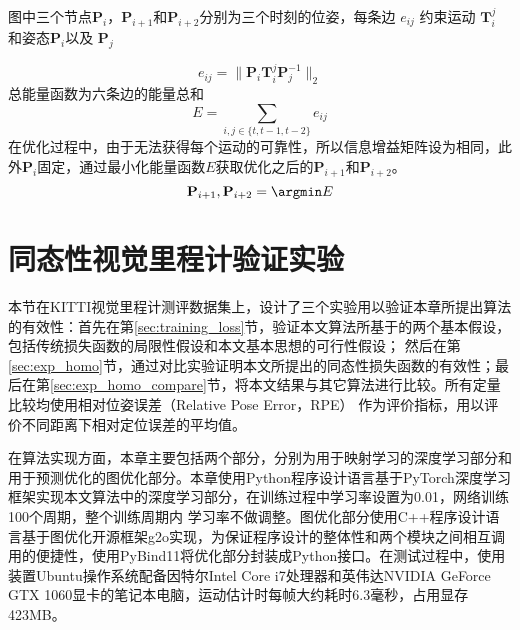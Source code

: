图中三个节点$\mathbf{P}_i$，$\mathbf{P}_{i+1}$和$\mathbf{P}_{i+2}$分别为三个时刻的位姿，每条边 ${e}_{ij}$ 约束运动
$\mathbf{T}_{i}^{j}$ 和姿态$\mathbf{P}_i$以及 $\mathbf{P}_j$ 

\begin{equation}
    e_{ij} = \|\mathbf{P}_i\mathbf{T}_{i}^{j}\mathbf{P}_j^{-1}\|_2
\end{equation}
总能量函数为六条边的能量总和
\begin{equation}
    E = \sum_{i,j \in \{t,t-1,t-2\}} e_{ij}
\end{equation}
在优化过程中，由于无法获得每个运动的可靠性，所以信息增益矩阵设为相同，此外$\mathbf{P}_i$固定，通过最小化能量函数$E$获取优化之后的$\mathbf{P}_{i+1}$和$\mathbf{P}_{i+2}$。
\begin{equation}
    \label{eq:optimize_out}
    \mathbf{P}_{i+1},\mathbf{P}_{i+2} = \argmin E
\end{equation}

\section{同态性视觉里程计验证实验}
\label{sec:homo_experiments}
本节在KITTI视觉里程计测评数据集\cite{geiger2012kitti}上，设计了三个实验用以验证本章所提出算法的有效性：首先在第\ref{sec:training_loss}节，验证本文算法所基于的两个基本假设，包括传统损失函数的局限性假设和本文基本思想的可行性假设；
然后在第\ref{sec:exp_homo}节，通过对比实验证明本文所提出的同态性损失函数的有效性；最后在第\ref{sec:exp_homo_compare}节，将本文结果与其它算法进行比较。所有定量比较均使用相对位姿误差（Relative Pose Error，RPE） \cite{geiger2012kitti}作为评价指标，用以评价不同距离下相对定位误差的平均值。



在算法实现方面，本章主要包括两个部分，分别为用于映射学习的深度学习部分和用于预测优化的图优化部分。本章使用Python程序设计语言基于PyTorch深度学习框架\cite{paszke2017automatic}实现本文算法中的深度学习部分，在训练过程中学习率设置为0.01，网络训练100个周期，整个训练周期内
学习率不做调整。图优化部分使用C++程序设计语言基于图优化开源框架g2o\cite{kummerle2011g}实现，为保证程序设计的整体性和两个模块之间相互调用的便捷性，使用PyBind11将优化部分封装成Python接口。在测试过程中，使用装置Ubuntu操作系统配备因特尔Intel Core i7处理器和英伟达NVIDIA GeForce GTX 1060显卡的笔记本电脑，运动估计时每帧大约耗时6.3毫秒，占用显存423MB。

